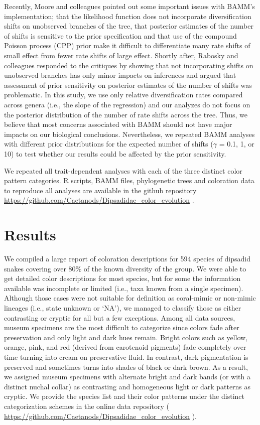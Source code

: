 Recently, Moore and colleagues \citeyear{moore_2016} pointed out some important issues with BAMM's implementation; that the likelihood function does not incorporate diversification shifts on unobserved branches of the tree, that posterior estimates of the number of shifts is sensitive to the prior specification and that use of the compound Poisson process (CPP) prior make it difficult to differentiate many rate shifts of small effect from fewer rate shifts of large effect. Shortly after, Rabosky and colleagues \citeyear{rabosky_2017} responded to the critiques by showing that not incorporating shifts on unobserved branches has only minor impacts on inferences and argued that \citet{moore_2016} assessment of prior sensitivity on posterior estimates of the number of shifts was problematic. In this study, we use only relative diversification rates compared across genera (i.e., the slope of the regression) and our analyzes do not focus on the posterior distribution of the number of rate shifts across the tree. Thus, we believe that most concerns associated with BAMM should not have major impacts on our biological conclusions. Nevertheless, we repeated BAMM analyses with different prior distributions for the expected number of shifts ($\gamma$ = 0.1, 1, or 10) to test whether our results could be affected by the prior sensitivity.

We repeated all trait-dependent analyses with each of the three distinct color pattern categories. R scripts, BAMM files, phylogenetic trees and coloration data to reproduce all analyses are available in the github repository \url{https://github.com/Caetanods/Dipsadidae_color_evolution} .

\section{Results}

We compiled a large report of coloration descriptions for 594 species of dipsadid snakes covering over 80\% of the known diversity of the group. We were able to get detailed color descriptions for most species, but for some the information available was incomplete or limited (i.e., taxa known from a single specimen). Although those cases were not suitable for definition as coral-mimic or non-mimic lineages (i.e., state unknown or `NA'), we managed to classify those as either contrasting or cryptic for all but a few exceptions. Among all data sources, museum specimens are the most difficult to categorize since colors fade after preservation and only light and dark hues remain. Bright colors such as yellow, orange, pink, and red (derived from carotenoid pigments) fade completely over time turning into cream on preservative fluid. In contrast, dark pigmentation is preserved and sometimes turns into shades of black or dark brown. As a result, we assigned museum specimens with alternate bright and dark bands (or with a distinct nuchal collar) as contrasting and homogeneous light or dark patterns as cryptic. We provide the species list and their color patterns under the distinct categorization schemes in the online data repository ( \url{https://github.com/Caetanods/Dipsadidae_color_evolution} ).

